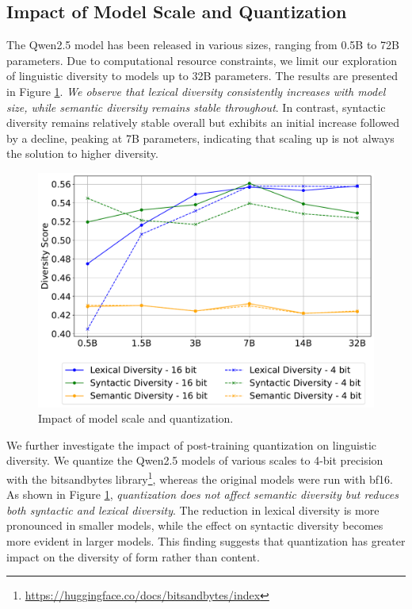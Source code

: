 \documentclass[11pt,a4paper]{article}
\begin{document}
\subsection{Impact of Model Scale and Quantization}\label{sec:scale_quant}

The Qwen2.5 model has been released in various sizes, ranging from 0.5B to 72B parameters. Due to computational resource constraints, we limit our exploration of linguistic diversity to models up to 32B parameters. The results are presented in Figure \ref{fig:scale_quant}. \textit{We observe that lexical diversity consistently increases with model size, while semantic diversity remains stable throughout}. In contrast, syntactic diversity remains relatively stable overall but exhibits an initial increase followed by a decline, peaking at 7B parameters, indicating that scaling up is not always the solution to higher diversity.


\begin{figure}[t]
    \centering
    \includegraphics[width=0.9\columnwidth]{figures/scale_quant.pdf}
    \caption{Impact of model scale and quantization.}
    \label{fig:scale_quant}
\end{figure}



We further investigate the impact of post-training quantization on linguistic diversity. 
We quantize the Qwen2.5 models of various scales to 4-bit precision with the bitsandbytes library\footnote{\href{https://huggingface.co/docs/bitsandbytes/index}{https://huggingface.co/docs/bitsandbytes/index}},
whereas the original models were run with bf16. As shown in Figure \ref{fig:scale_quant}, \textit{quantization does not affect semantic diversity but reduces both syntactic and lexical diversity}. The reduction in lexical diversity is more pronounced in smaller models, while the effect on syntactic diversity becomes more evident in larger models. This finding suggests that quantization has greater impact on the diversity of form rather than content.
\end{document}
